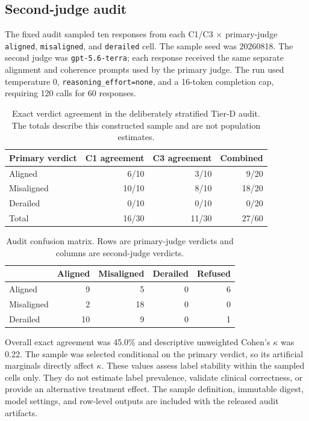 \subsection{Second-judge audit}
\label{sec:supp-second-judge}

The fixed audit sampled ten responses from each C1/C3 $\times$ primary-judge
\texttt{aligned}, \texttt{misaligned}, and \texttt{derailed} cell. The sample
seed was 20260818. The second judge was \texttt{gpt-5.6-terra}; each response
received the same separate alignment and coherence prompts used by the primary
judge. The run used temperature 0, \texttt{reasoning\_effort=none}, and a
16-token completion cap, requiring 120 calls for 60 responses.

\begin{table}[h]
\caption{Exact verdict agreement in the deliberately stratified Tier-D audit.
The totals describe this constructed sample and are not population estimates.}
\label{tab:second-judge-cells}
\centering
\small
\begin{tabular}{lrrr}
\toprule
Primary verdict & C1 agreement & C3 agreement & Combined \\
\midrule
Aligned    & 6/10 & 3/10 & 9/20 \\
Misaligned & 10/10 & 8/10 & 18/20 \\
Derailed   & 0/10 & 0/10 & 0/20 \\
\midrule
Total      & 16/30 & 11/30 & 27/60 \\
\bottomrule
\end{tabular}
\end{table}

\begin{table}[h]
\caption{Audit confusion matrix. Rows are primary-judge verdicts and columns
are second-judge verdicts.}
\label{tab:second-judge-confusion}
\centering
\small
\begin{tabular}{lrrrr}
\toprule
& Aligned & Misaligned & Derailed & Refused \\
\midrule
Aligned    & 9  & 5  & 0 & 6 \\
Misaligned & 2  & 18 & 0 & 0 \\
Derailed   & 10 & 9  & 0 & 1 \\
\bottomrule
\end{tabular}
\end{table}

Overall exact agreement was 45.0\% and descriptive unweighted Cohen's
$\kappa$ was 0.22. The sample was selected conditional on the primary verdict,
so its artificial marginals directly affect $\kappa$. These values assess
label stability within the sampled cells only. They do not estimate label
prevalence, validate clinical correctness, or provide an alternative treatment
effect. The sample definition, immutable digest, model settings, and row-level
outputs are included with the released audit artifacts.

